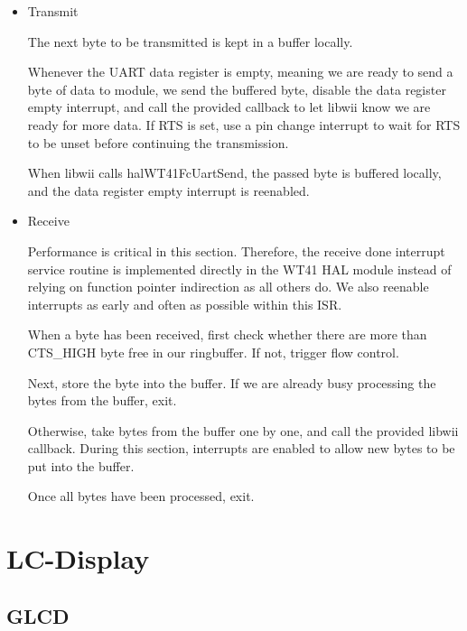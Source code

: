 \documentclass[12pt,a4paper,titlepage,oneside]{article}
\begin{document}
\begin{itemize}
 \item Transmit

 The next byte to be transmitted is kept in a buffer locally.
 
 Whenever the UART data register is empty, meaning we are ready to send a 
 byte of data to module, we send the buffered byte, disable the data register
 empty interrupt, and call the provided callback to let libwii know we are ready
 for more data. If RTS is set, use a pin change interrupt to wait for RTS to be
 unset before continuing the transmission.
 
 When libwii calls halWT41FcUartSend, the passed byte is buffered locally, and
 the data register empty interrupt is reenabled.
 
 \item Receive
 
 Performance is critical in this section. Therefore, the receive done interrupt
 service routine is implemented directly in the WT41 HAL module instead of relying
 on function pointer indirection as all others do. We also reenable interrupts
 as early and often as possible within this ISR.
 
 When a byte has been received, first check whether there are more than CTS\_HIGH
 byte free in our ringbuffer. If not, trigger flow control.
 
 Next, store the byte into the buffer. If we are already busy processing the bytes
 from the buffer, exit.
 
 Otherwise, take bytes from the buffer one by one, and call the provided libwii 
 callback. During this section, interrupts are enabled to allow new bytes to
 be put into the buffer.
 
 Once all bytes have been processed, exit.
 
\end{itemize}


\section{LC-Display}

\subsection{GLCD}
\end{document}
